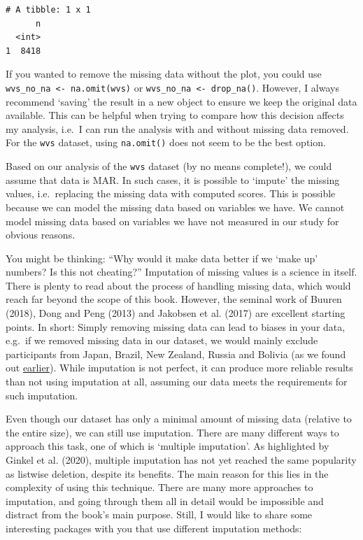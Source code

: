 \documentclass[
  letterpaper,
]{krantz}
\begin{document}
\begin{verbatim}
# A tibble: 1 x 1
      n
  <int>
1  8418
\end{verbatim}

If you wanted to remove the missing data without the plot, you could use
\texttt{wvs\_no\_na\ \textless{}-\ na.omit(wvs)} or
\texttt{wvs\_no\_na\ \textless{}-\ drop\_na()}. However, I always
recommend `saving' the result in a new object to ensure we keep the
original data available. This can be helpful when trying to compare how
this decision affects my analysis, i.e.~I can run the analysis with and
without missing data removed. For the \texttt{wvs} dataset, using
\texttt{na.omit()} does not seem to be the best option.

Based on our analysis of the \texttt{wvs} dataset (by no means
complete!), we could assume that data is MAR. In such cases, it is
possible to `impute' the missing values, i.e.~replacing the missing data
with computed scores. This is possible because we can model the missing
data based on variables we have. We cannot model missing data based on
variables we have not measured in our study for obvious reasons.

You might be thinking: ``Why would it make data better if we `make up'
numbers? Is this not cheating?'' Imputation of missing values is a
science in itself. There is plenty to read about the process of handling
missing data, which would reach far beyond the scope of this book.
However, the seminal work of Buuren (2018), Dong and Peng (2013) and
Jakobsen et al. (2017) are excellent starting points. In short: Simply
removing missing data can lead to biases in your data, e.g.~if we
removed missing data in our dataset, we would mainly exclude
participants from Japan, Brazil, New Zealand, Russia and Bolivia (as we
found out \hyperref[missing-data-by-country-table]{earlier}). While
imputation is not perfect, it can produce more reliable results than not
using imputation at all, assuming our data meets the requirements for
such imputation.

Even though our dataset has only a minimal amount of missing data
(relative to the entire size), we can still use imputation. There are
many different ways to approach this task, one of which is `multiple
imputation'. As highlighted by Ginkel et al. (2020), multiple imputation
has not yet reached the same popularity as listwise deletion, despite
its benefits. The main reason for this lies in the complexity of using
this technique. There are many more approaches to imputation, and going
through them all in detail would be impossible and distract from the
book's main purpose. Still, I would like to share some interesting
packages with you that use different imputation methods:
\end{document}
